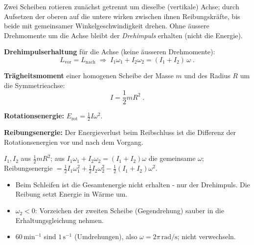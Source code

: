 
Zwei Scheiben rotieren zunächst getrennt um dieselbe (vertikale) Achse; durch
Aufsetzen der oberen auf die untere wirken zwischen ihnen Reibungskräfte, bis
beide mit gemeinsamer Winkelgeschwindigkeit drehen. Ohne äussere Drehmomente
um die Achse bleibt der \emph{Drehimpuls} erhalten (nicht die Energie).

\begin{werkzeugkasten}[Werkzeuge]
\textbf{Drehimpulserhaltung} für die Achse (keine äusseren Drehmomente):
\begin{equation}
  L_\mathrm{vor} = L_\mathrm{nach}
  \;\Rightarrow\;
  I_1\omega_1 + I_2\omega_2 = (I_1+I_2)\,\omega\;.
\end{equation}

\textbf{Trägheitsmoment} einer homogenen Scheibe der Masse $m$ und des Radius
$R$ um die Symmetrieachse:
\begin{equation}
  I = \frac12 m R^2\;.
\end{equation}

\textbf{Rotationsenergie:} $E_\mathrm{rot}=\frac12 I\omega^2$.

\textbf{Reibungsenergie:} Der Energieverlust beim Reibschluss ist die Differenz
der Rotationsenergien vor und nach dem Vorgang.
\end{werkzeugkasten}

\begin{werkzeugkasten}
$I_1,I_2$ aus $\frac12 mR^2$; aus $I_1\omega_1+I_2\omega_2=(I_1+I_2)\omega$
die gemeinsame $\omega$; Reibungsenergie $=\frac12 I_1\omega_1^2
+\frac12 I_2\omega_2^2-\frac12 (I_1+I_2)\omega^2$.
\end{werkzeugkasten}

\begin{achtung}
\begin{itemize}
  \item Beim Schleifen ist die Gesamtenergie nicht erhalten - nur der
       Drehimpuls. Die Reibung setzt Energie in Wärme um.
  \item $\omega_2<0$: Vorzeichen der zweiten Scheibe (Gegendrehung) sauber
       in die Erhaltungsgleichung nehmen.
  \item $60\,\mathrm{min}^{-1}$ sind $1\,\mathrm s^{-1}$ (Umdrehungen),
       also $\omega=2\pi\,\mathrm{rad/s}$; nicht verwechseln.
\end{itemize}
\end{achtung}